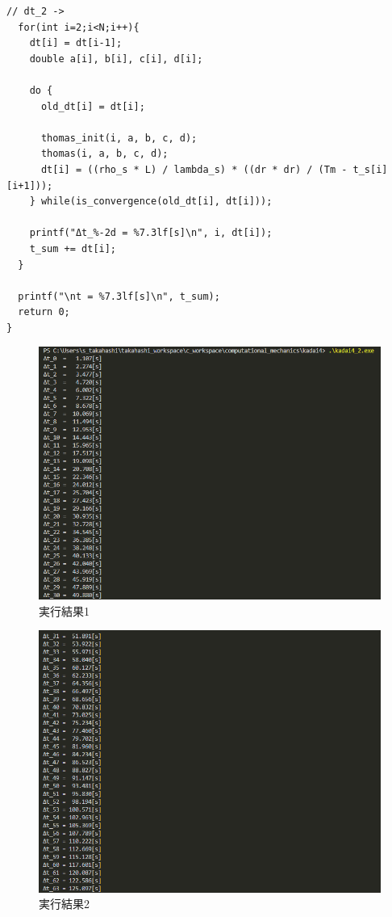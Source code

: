 \begin{lstlisting}[caption=円筒状物体が凍結するまでの時間を後退差分法のVTS法で求めるプログラム,label=s1]
  // dt_2 ->
  for(int i=2;i<N;i++){
    dt[i] = dt[i-1];
    double a[i], b[i], c[i], d[i];

    do {
      old_dt[i] = dt[i];

      thomas_init(i, a, b, c, d);
      thomas(i, a, b, c, d);
      dt[i] = ((rho_s * L) / lambda_s) * ((dr * dr) / (Tm - t_s[i][i+1]));
    } while(is_convergence(old_dt[i], dt[i]));

    printf("Δt_%-2d = %7.3lf[s]\n", i, dt[i]);
    t_sum += dt[i];
  }

  printf("\nt = %7.3lf[s]\n", t_sum);
  return 0;
}
\end{lstlisting}

\begin{figure}[H]
  \begin{center}
    \includegraphics[width=.8\linewidth]{img/k4_1.png}
    \caption{実行結果1}
    \label{im1}
  \end{center}
\end{figure}
\begin{figure}[H]
  \begin{center}
    \includegraphics[width=.8\linewidth]{img/k4_2.png}
    \caption{実行結果2}
    \label{im2}
  \end{center}
\end{figure}
